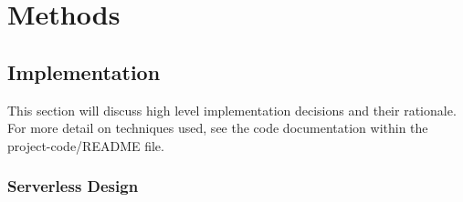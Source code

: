 \documentclass[10pt,twocolumn]{article}
\begin{document}

\section{Methods} 



\subsection{Implementation}

This section will discuss high level implementation decisions and their rationale. For more detail on techniques used, 
see the code documentation within the project-code/README file.

\subsubsection{Serverless Design}
\end{document}
